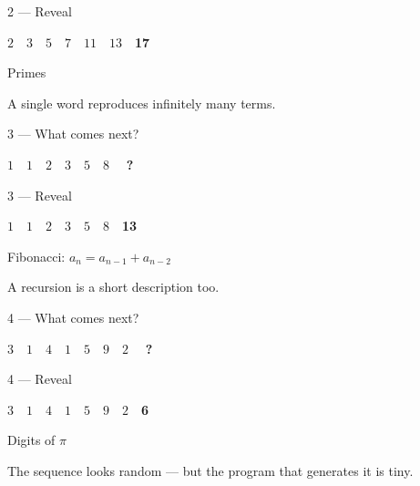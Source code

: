 \documentclass[aspectratio=169, 12pt, xcolor={dvipsnames}]{beamer}
\newcommand{\seq}[1]{{\huge\ttfamily #1}}
\newcommand{\blank}{\textcolor{accent}{\textbf{?}}}
\newcommand{\ans}[1]{\textcolor{accent}{\textbf{#1}}}
\newcommand{\hintline}[1]{\vfill\begin{center}\small\textcolor{hint}{#1}\end{center}}
\begin{document}
\begin{frame}{2 --- Reveal}
\vfill
\begin{center}\seq{$2 \quad 3 \quad 5 \quad 7 \quad 11 \quad 13 \quad $\ans{17}}\end{center}
\vfill
\begin{center}\Large Primes\end{center}
\hintline{A single word reproduces infinitely many terms.}
\end{frame}

\begin{frame}{3 --- What comes next?}
\vfill
\begin{center}\seq{$1 \quad 1 \quad 2 \quad 3 \quad 5 \quad 8 \quad$ \blank}\end{center}
\vfill
\end{frame}

\begin{frame}{3 --- Reveal}
\vfill
\begin{center}\seq{$1 \quad 1 \quad 2 \quad 3 \quad 5 \quad 8 \quad $\ans{13}}\end{center}
\vfill
\begin{center}\Large Fibonacci: $a_n = a_{n-1} + a_{n-2}$\end{center}
\hintline{A recursion is a short description too.}
\end{frame}

\begin{frame}{4 --- What comes next?}
\vfill
\begin{center}\seq{$3 \quad 1 \quad 4 \quad 1 \quad 5 \quad 9 \quad 2 \quad$ \blank}\end{center}
\vfill
\end{frame}

\begin{frame}{4 --- Reveal}
\vfill
\begin{center}\seq{$3 \quad 1 \quad 4 \quad 1 \quad 5 \quad 9 \quad 2 \quad $\ans{6}}\end{center}
\vfill
\begin{center}\Large Digits of $\pi$\end{center}
\hintline{The sequence looks random --- but the program that generates it is tiny.}
\end{frame}
\end{document}
